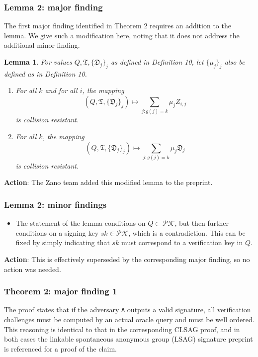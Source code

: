 \documentclass{article}
\newtheorem*{lemma}{Lemma}
\begin{document}
\subsubsection{Lemma 2: major finding}

The first major finding identified in Theorem 2 requires an addition to the lemma.
We give such a modification here, noting that it does not address the additional minor finding.

\begin{lemma}
	For values $Q, \mathfrak{T}, \{\mathfrak{D}_j\}_j$ as defined in Definition 10, let $\{\mu_j\}_j$ also be defined as in Definition 10.

	\begin{enumerate}
		\item For all $k$ and for all $i$, the mapping $$(Q, \mathfrak{T}, \{\mathfrak{D}_j\}_j) \mapsto \sum_{j:g(j)=k} \mu_j Z_{i,j}$$ is collision resistant.

		\item For all $k$, the mapping $$(Q, \mathfrak{T}, \{\mathfrak{D}_j\}_j) \mapsto \sum_{j:g(j)=k} \mu_j \mathfrak{D}_j$$ is collision resistant.
	\end{enumerate}
\end{lemma}

\textbf{Action}: The Zano team added this modified lemma to the preprint.


\subsubsection{Lemma 2: minor findings}

\begin{itemize}
	\item The statement of the lemma conditions on $Q \subset \mathcal{PK}$, but then further conditions on a signing key $sk \in \mathcal{PK}$, which is a contradiction.
	This can be fixed by simply indicating that $sk$ must correspond to a verification key in $Q$.
\end{itemize}

\textbf{Action}: This is effectively superseded by the corresponding major finding, so no action was needed.


\subsubsection{Theorem 2: major finding 1}

The proof states that if the adversary \texttt{A} outputs a valid signature, all verification challenges must be computed by an actual oracle query and must be well ordered.
This reasoning is identical to that in the corresponding CLSAG proof, and in both cases the linkable spontaneous anonymous group (LSAG) signature preprint \cite{lsag} is referenced for a proof of the claim.
\end{document}
